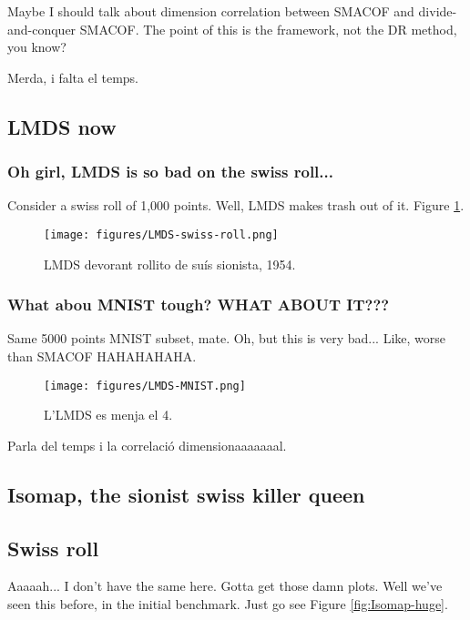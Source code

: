 Maybe I should talk about dimension correlation between SMACOF and divide-and-conquer SMACOF. The point of this is the framework, not the DR method, you know?

Merda, i falta el temps.


\subsection{LMDS now}

\subsubsection{Oh girl, LMDS is so bad on the swiss roll...}

Consider a swiss roll of 1,000 points. Well, LMDS makes trash out of it. Figure \ref{fig:LMDS-swiss-roll}.

\begin{figure}[ht]
    \centering
    \texttt{[image: figures/LMDS-swiss-roll.png]}
    \caption{LMDS devorant rollito de suís sionista, 1954.}
    \label{fig:LMDS-swiss-roll}
\end{figure}

\subsubsection{What abou MNIST tough? WHAT ABOUT IT???}

Same 5000 points MNIST subset, mate. Oh, but this is very bad... Like, worse than SMACOF HAHAHAHAHA.

\begin{figure}[ht]
    \centering
    \texttt{[image: figures/LMDS-MNIST.png]}
    \caption{L'LMDS es menja el 4.}
    \label{fig:LMDS-MNIST}
\end{figure}

Parla del temps i la correlació dimensionaaaaaaal.

\subsection{Isomap, the sionist swiss killer queen}

\subsection{Swiss roll}

Aaaaah... I don't have the same here. Gotta get those damn plots. Well we've seen this before, in the initial benchmark. Just go see Figure \ref{fig:Isomap-huge}.

